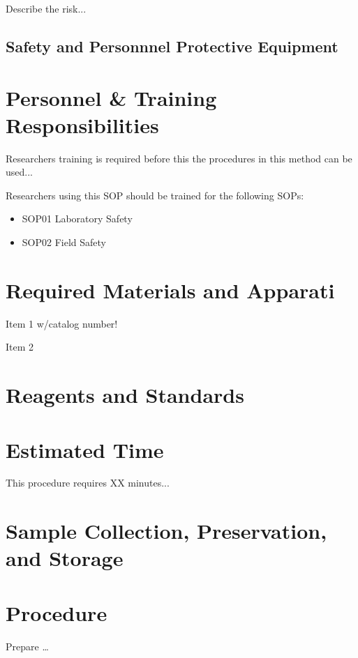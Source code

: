 \documentclass[12pt]{../SOP3_beta}
\begin{document}
\NP Describe the risk...


\subsection*{Safety and Personnnel Protective Equipment}


\section{Personnel \& Training Responsibilities}

\NP Researchers training is required before this the procedures in this method can be used... 

\NP Researchers using this SOP should be trained for the following SOPs:

\begin{itemize}
  \item SOP01 Laboratory Safety
  \item SOP02 Field Safety
\end{itemize}

\section{Required Materials and Apparati}

\NP Item 1 w/catalog number!

\NP Item 2

\section{Reagents and Standards}

\section{Estimated Time}

\NP This procedure requires XX minutes...

\section{Sample Collection, Preservation, and Storage}

\section{Procedure}

\NP Prepare \dots

\NP
\end{document}
